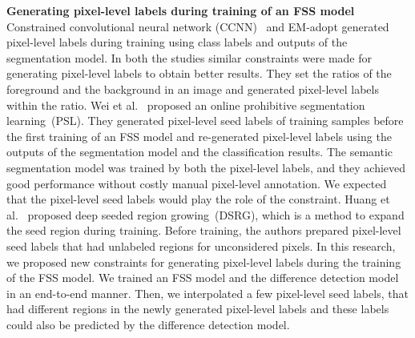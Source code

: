 \documentclass[10pt,twocolumn,letterpaper]{article}
\begin{document}
\noindent
{\bf Generating pixel-level labels during training of an FSS model~~}
Constrained convolutional neural network (CCNN)~\cite{Pathak15} and EM-adopt \cite{papa15} generated pixel-level labels during training
using class labels and outputs of the segmentation model.
In both the studies similar constraints were made for 
generating pixel-level labels to obtain better results.
They set the ratios of the foreground and the background in an image and 
generated pixel-level labels within the ratio.
Wei et al.~\cite{erasing} proposed an online prohibitive segmentation learning~(PSL).
They generated pixel-level seed labels of training samples before the first training of an FSS model and re-generated pixel-level labels 
using the outputs of the segmentation model and the classification results.
The semantic segmentation model was trained by both the pixel-level labels, 
and they achieved good performance without costly manual pixel-level annotation.
We expected that the pixel-level seed labels would play the role of the constraint.
Huang et al.~\cite{dsrg} proposed deep seeded region growing~(DSRG), which is a method to expand the seed region during training.
Before training, the authors prepared pixel-level seed labels that had unlabeled regions for unconsidered pixels.
In this research, we proposed new constraints for generating pixel-level labels during the training of the FSS model. 
We trained an FSS model and the difference detection model in an end-to-end manner. 
Then, we interpolated a few pixel-level seed labels,
that had different regions in the newly generated pixel-level labels and these labels could also be predicted by the difference detection model.
\end{document}
